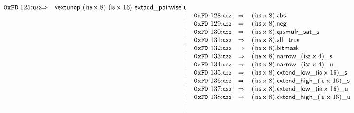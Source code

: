 $$\begin{array}{@{}l@{}rrlll@{}l@{}}
\mathtt{0xFD}~125{:}{\mathtt{u{\scriptstyle32}}} &\Rightarrow& \mathsf{vextunop}~(\mathsf{i{\scriptstyle16}}~\mathsf{x}~8)~(\mathsf{i{\scriptstyle8}}~\mathsf{x}~16)~\mathsf{extadd\_pairwise}~\mathsf{u} \\ &&|&
\mathtt{0xFD}~128{:}{\mathtt{u{\scriptstyle32}}} &\Rightarrow& (\mathsf{i{\scriptstyle16}}~\mathsf{x}~8) . \mathsf{abs} \\ &&|&
\mathtt{0xFD}~129{:}{\mathtt{u{\scriptstyle32}}} &\Rightarrow& (\mathsf{i{\scriptstyle16}}~\mathsf{x}~8) . \mathsf{neg} \\ &&|&
\mathtt{0xFD}~130{:}{\mathtt{u{\scriptstyle32}}} &\Rightarrow& (\mathsf{i{\scriptstyle16}}~\mathsf{x}~8) . \mathsf{q{\scriptstyle15}mulr\_sat\_s} \\ &&|&
\mathtt{0xFD}~131{:}{\mathtt{u{\scriptstyle32}}} &\Rightarrow& (\mathsf{i{\scriptstyle16}}~\mathsf{x}~8) . \mathsf{all\_true} \\ &&|&
\mathtt{0xFD}~132{:}{\mathtt{u{\scriptstyle32}}} &\Rightarrow& (\mathsf{i{\scriptstyle16}}~\mathsf{x}~8).\mathsf{bitmask} \\ &&|&
\mathtt{0xFD}~133{:}{\mathtt{u{\scriptstyle32}}} &\Rightarrow& {{{{(\mathsf{i{\scriptstyle16}}~\mathsf{x}~8).\mathsf{narrow}}{\mathsf{\_}}}{(\mathsf{i{\scriptstyle32}}~\mathsf{x}~4)}}{\mathsf{\_}}}{\mathsf{s}} \\ &&|&
\mathtt{0xFD}~134{:}{\mathtt{u{\scriptstyle32}}} &\Rightarrow& {{{{(\mathsf{i{\scriptstyle16}}~\mathsf{x}~8).\mathsf{narrow}}{\mathsf{\_}}}{(\mathsf{i{\scriptstyle32}}~\mathsf{x}~4)}}{\mathsf{\_}}}{\mathsf{u}} \\ &&|&
\mathtt{0xFD}~135{:}{\mathtt{u{\scriptstyle32}}} &\Rightarrow& (\mathsf{i{\scriptstyle16}}~\mathsf{x}~8) . {{{{{{\mathsf{extend}}{\mathsf{\_}}}{\mathsf{low}}}{\mathsf{\_}}}{(\mathsf{i{\scriptstyle8}}~\mathsf{x}~16)}}{\mathsf{\_}}}{\mathsf{s}} \\ &&|&
\mathtt{0xFD}~136{:}{\mathtt{u{\scriptstyle32}}} &\Rightarrow& (\mathsf{i{\scriptstyle16}}~\mathsf{x}~8) . {{{{{{\mathsf{extend}}{\mathsf{\_}}}{\mathsf{high}}}{\mathsf{\_}}}{(\mathsf{i{\scriptstyle8}}~\mathsf{x}~16)}}{\mathsf{\_}}}{\mathsf{s}} \\ &&|&
\mathtt{0xFD}~137{:}{\mathtt{u{\scriptstyle32}}} &\Rightarrow& (\mathsf{i{\scriptstyle16}}~\mathsf{x}~8) . {{{{{{\mathsf{extend}}{\mathsf{\_}}}{\mathsf{low}}}{\mathsf{\_}}}{(\mathsf{i{\scriptstyle8}}~\mathsf{x}~16)}}{\mathsf{\_}}}{\mathsf{u}} \\ &&|&
\mathtt{0xFD}~138{:}{\mathtt{u{\scriptstyle32}}} &\Rightarrow& (\mathsf{i{\scriptstyle16}}~\mathsf{x}~8) . {{{{{{\mathsf{extend}}{\mathsf{\_}}}{\mathsf{high}}}{\mathsf{\_}}}{(\mathsf{i{\scriptstyle8}}~\mathsf{x}~16)}}{\mathsf{\_}}}{\mathsf{u}} \\ &&|&

\end{array}$$
